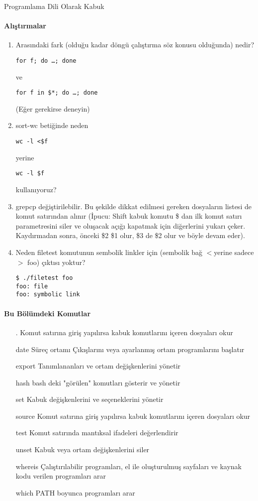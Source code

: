 \begin{section}{Programlama Dili Olarak Kabuk}
\paragraph{{\Huge{\PencilLeftDown}}Alıştırmalar}{
\begin{enumerate}
\item Arasındaki fark (olduğu kadar döngü çalıştırma söz konusu olduğunda) nedir?
\begin{verbatim}
for f; do …; done
\end{verbatim}
ve
\begin{verbatim}
for f in $*; do …; done
\end{verbatim}
(Eğer gerekirse deneyin)
\item sort-wc betiğinde neden
\begin{verbatim}
wc -l <$f
\end{verbatim}
yerine
\begin{verbatim}
wc -l $f
\end{verbatim}
kullanıyoruz?
\item grepcp değiştirilebilir. Bu şekilde dikkat edilmesi gereken dosyaların listesi de komut satırından alınır (İpucu: Shift kabuk komutu \$ dan ilk komut satırı parametresini siler ve oluşacak açığı kapatmak için diğerlerini yukarı çeker. Kaydırmadan sonra, önceki \$2 \$1 olur, \$3 de \$2 olur ve böyle devam eder).
\item Neden filetest komutunun sembolik linkler için (sembolik bağ $<$yerine sadece$>$ foo) çıktısı yoktur?
\begin{verbatim}
$ ./filetest foo
foo: file
foo: symbolic link
\end{verbatim}
\end{enumerate}
}
\end{section}
\paragraph{Bu Bölümdeki Komutlar}{
\begin{itemize}
\item[.]Komut satırına giriş yapılırsa kabuk komutlarını içeren dosyaları okur
\item[date]Süreç ortamı Çıkışlarını veya ayarlanmış ortam programlarını başlatır
\item[export]Tanımlananları ve ortam değişkenlerini yönetir
\item[hash]bash deki "görülen" komutları gösterir ve yönetir
\item[set]Kabuk değişkenlerini ve seçeneklerini yönetir
\item[source]Komut satırına giriş yapılırsa kabuk komutlarını içeren dosyaları okur
\item[test]Komut satırında mantıksal ifadeleri değerlendirir
\item[unset]Kabuk veya ortam değişkenlerini siler
\item[whereis]Çalıştırılabilir programları, el ile oluşturulmuş sayfaları ve kaynak kodu verilen programları arar
\item[which]PATH boyunca programları arar
\end{itemize}}

